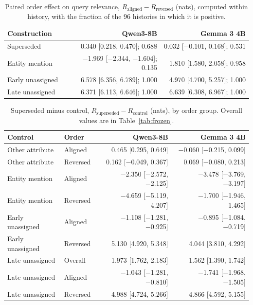 \begin{table}[h]
\caption{Paired order effect on query relevance, $R_{\text{aligned}}-R_{\text{reversed}}$ (nats), computed within history, with the fraction of the 96 histories in which it is positive.}
\label{tab:b-paired-r}
\begin{center}
\small
\begin{tabular}{@{}lrr@{}}
\toprule
Construction & Qwen3-8B & Gemma 3 4B \\
\midrule
Superseded & 0.340 [0.218, 0.470]; 0.688 & 0.032 [−0.101, 0.168]; 0.531 \\
Entity mention & −1.969 [−2.344, −1.604]; 0.135 & 1.810 [1.580, 2.058]; 0.958 \\
Early unassigned & 6.578 [6.356, 6.789]; 1.000 & 4.970 [4.700, 5.257]; 1.000 \\
Late unassigned & 6.371 [6.113, 6.646]; 1.000 & 6.639 [6.308, 6.967]; 1.000 \\
\bottomrule
\end{tabular}
\end{center}
\end{table}

\begin{table}[h]
\caption{Superseded minus control, $R_{\text{superseded}}-R_{\text{control}}$ (nats), by order group. Overall values are in Table~\ref{tab:frozen}.}
\label{tab:b-order}
\begin{center}
\small
\begin{tabular}{@{}llrr@{}}
\toprule
Control & Order & Qwen3-8B & Gemma 3 4B \\
\midrule
Other attribute & Aligned & 0.465 [0.295, 0.649] & −0.060 [−0.215, 0.099] \\
Other attribute & Reversed & 0.162 [−0.049, 0.367] & 0.069 [−0.080, 0.213] \\
Entity mention & Aligned & −2.350 [−2.572, −2.125] & −3.478 [−3.769, −3.197] \\
Entity mention & Reversed & −4.659 [−5.119, −4.207] & −1.700 [−1.946, −1.465] \\
Early unassigned & Aligned & −1.108 [−1.281, −0.925] & −0.895 [−1.084, −0.719] \\
Early unassigned & Reversed & 5.130 [4.920, 5.348] & 4.044 [3.810, 4.292] \\
Late unassigned & Overall & 1.973 [1.762, 2.183] & 1.562 [1.390, 1.742] \\
Late unassigned & Aligned & −1.043 [−1.281, −0.810] & −1.741 [−1.968, −1.505] \\
Late unassigned & Reversed & 4.988 [4.724, 5.266] & 4.866 [4.592, 5.155] \\
\bottomrule
\end{tabular}
\end{center}
\end{table}

